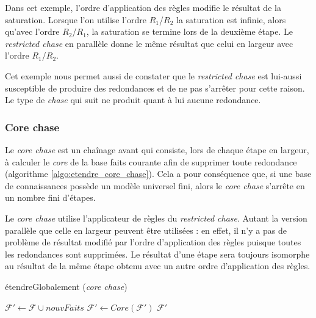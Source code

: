 Dans cet exemple, l'ordre d'application des règles modifie le résultat de la saturation. Lorsque l'on utilise l'ordre $R_1$/$R_2$ la saturation est infinie, alors qu'avec l'ordre $R_2$/$R_1$, la saturation se termine lors de la deuxième étape. Le \textit{restricted chase} en parallèle donne le même résultat que celui en largeur avec l'ordre $R_1$/$R_2$.
\par Cet exemple nous permet aussi de constater que le \textit{restricted chase} est lui-aussi susceptible de produire des redondances et de ne pas s'arrêter pour cette raison. Le type de \textit{chase} qui suit ne produit quant à lui aucune redondance.

\subsubsection{Core chase}\label{sec:core_chase}

Le \textit{core chase} est un chaînage avant qui consiste, lors de chaque étape en largeur, à calculer le \textit{core} de la base faits courante afin de supprimer toute redondance (algorithme \ref{algo:etendre_core_chase}).
Cela a pour conséquence que, si une base de connaissances possède un modèle universel fini, alors le \textit{core chase} s'arrête en un nombre fini d'étapes.
\par Le \textit{core chase} utilise l'applicateur de règles du \textit{restricted chase}. Autant la version parallèle que celle en largeur peuvent être utilisées : en effet, il n'y a pas de problème de résultat modifié par l'ordre d'application des règles puisque toutes les redondances sont supprimées. Le résultat d'une étape sera toujours isomorphe au résultat de la même étape obtenu avec un autre ordre d'application des règles.

\begin{algorithm}[H]\label{algo:etendre_core_chase}
\caption{étendreGlobalement (\textit{core chase})}
\SetAlgoLined
\DontPrintSemicolon
\SetAlgoLined
\DontPrintSemicolon
{}
    $\mathcal{F'} \gets \mathcal{F} \cup nouvFaits$\;
    $\mathcal{F'} \gets Core(\mathcal{F'})$\;
    \Return $\mathcal{F'}$
\end{algorithm}


